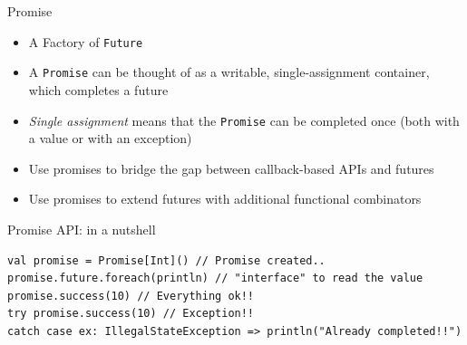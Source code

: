 \documentclass[presentation, 9pt]{beamer}\mode<presentation>{\usetheme{AMSBolognaFC}}
\begin{document}
\begin{frame}[fragile]{Promise}
\begin{itemize}
	\item A Factory of \texttt{Future}
 	\item A \texttt{Promise} can be thought of as a writable, single-assignment container, which completes a future
  \item \emph{Single assignment} means that the \texttt{Promise} can be completed once (both with a value or with an exception)
  \item Use promises to bridge the gap between callback-based APIs and futures
  \item Use promises to extend futures with additional functional combinators
\end{itemize}
\begin{alertblock}{Promise API: in a nutshell}
	\begin{tcolorbox}[left=0pt, top=0pt, bottom=0pt]
		\begin{verbatim}
val promise = Promise[Int]() // Promise created..
promise.future.foreach(println) // "interface" to read the value
promise.success(10) // Everything ok!!
try promise.success(10) // Exception!!
catch case ex: IllegalStateException => println("Already completed!!")
		\end{verbatim}
	\end{tcolorbox}
\end{alertblock}
\end{frame}
\end{document}
